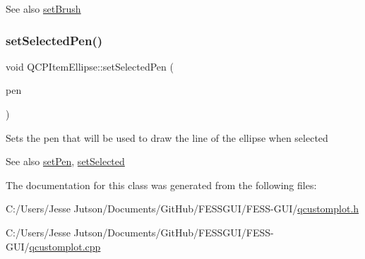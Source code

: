 \begin{DoxySeeAlso}{See also}
\hyperlink{class_q_c_p_item_ellipse_a49fc74e6965834e873d027d026def798}{set\+Brush} 
\end{DoxySeeAlso}
\hypertarget{class_q_c_p_item_ellipse_a6c542fba1dc918041c583f58a50dde99}{}\label{class_q_c_p_item_ellipse_a6c542fba1dc918041c583f58a50dde99} 
\subsubsection{\texorpdfstring{set\+Selected\+Pen()}{setSelectedPen()}}
{\footnotesize\ttfamily void Q\+C\+P\+Item\+Ellipse\+::set\+Selected\+Pen (\begin{DoxyParamCaption}\item[{const Q\+Pen \&}]{pen }\end{DoxyParamCaption})}

Sets the pen that will be used to draw the line of the ellipse when selected

\begin{DoxySeeAlso}{See also}
\hyperlink{class_q_c_p_item_ellipse_adb81a663ed2420fcfa011e49f678d1a6}{set\+Pen}, \hyperlink{class_q_c_p_abstract_item_a203de94ad586cc44d16c9565f49d3378}{set\+Selected} 
\end{DoxySeeAlso}


The documentation for this class was generated from the following files\+:\begin{DoxyCompactItemize}
\item 
C\+:/\+Users/\+Jesse Jutson/\+Documents/\+Git\+Hub/\+F\+E\+S\+S\+G\+U\+I/\+F\+E\+S\+S-\/\+G\+U\+I/\hyperlink{qcustomplot_8h}{qcustomplot.\+h}\item 
C\+:/\+Users/\+Jesse Jutson/\+Documents/\+Git\+Hub/\+F\+E\+S\+S\+G\+U\+I/\+F\+E\+S\+S-\/\+G\+U\+I/\hyperlink{qcustomplot_8cpp}{qcustomplot.\+cpp}\end{DoxyCompactItemize}
